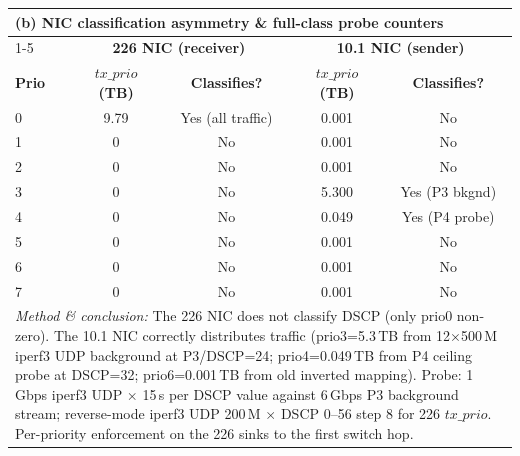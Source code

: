 \begin{table}[htbp]
\vspace{8pt}
\begin{tabular}{lcccc}
\toprule
\multicolumn{5}{l}{\textbf{(b) NIC classification asymmetry \& full-class probe counters}} \\
\cmidrule(lr){1-5}
& \multicolumn{2}{c}{\textbf{226 NIC (receiver)}} & \multicolumn{2}{c}{\textbf{10.1 NIC (sender)}} \\
\textbf{Prio} & \textbf{${tx\_prio}$ (TB)} & \textbf{Classifies?} & \textbf{${tx\_prio}$ (TB)} & \textbf{Classifies?} \\
\midrule
0 & 9.79 & Yes (all traffic) & 0.001 & No \\
1 & 0    & No                & 0.001 & No \\
2 & 0    & No                & 0.001 & No \\
3 & 0    & No                & 5.300 & Yes (P3 bkgnd) \\
4 & 0    & No                & 0.049 & Yes (P4 probe) \\
5 & 0    & No                & 0.001 & No \\
6 & 0    & No                & 0.001 & No \\
7 & 0    & No                & 0.001 & No \\
\midrule
\multicolumn{5}{p{0.85\linewidth}}{\small\textit{Method \& conclusion:} The 226 NIC does not classify DSCP (only prio0 non-zero).  The 10.1 NIC correctly distributes traffic (prio3=5.3\,TB from 12$\times$500\,M iperf3 UDP background at P3/DSCP=24; prio4=0.049\,TB from P4 ceiling probe at DSCP=32; prio6=0.001\,TB from old inverted mapping).  Probe: 1\,Gbps iperf3 UDP $\times$ 15\,s per DSCP value against 6\,Gbps P3 background stream; reverse-mode iperf3 UDP 200\,M $\times$ DSCP 0--56 step 8 for 226 ${tx\_prio}$.  Per-priority enforcement on the 226 sinks to the first switch hop.} \\
\bottomrule
\end{tabular}
\end{table}

